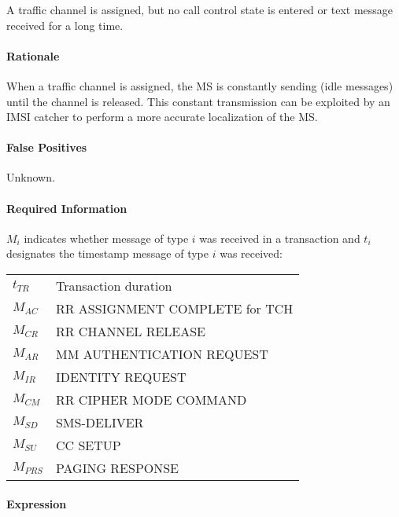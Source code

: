 \documentclass[a4paper,11pt,notitlepage,bigheadings,oneside]{scrartcl}
\begin{document}
\subsubsection{}

A traffic channel is assigned, but no call control state is entered or text
message received for a long time.

\paragraph{Rationale}

When a traffic channel is assigned, the MS is constantly sending (idle
messages) until the channel is released. This constant transmission can be
exploited by an IMSI catcher to perform a more accurate localization of the MS.

\paragraph{False Positives}

Unknown.

\paragraph{Required Information}

$M_i$ indicates whether message of type $i$ was received in a transaction and
$t_i$ designates the timestamp message of type $i$ was received:

\begin{tabular}{ll}
\hline
$t_{TR} $ & Transaction duration \\
$M_{AC} $ & RR ASSIGNMENT COMPLETE for TCH \\
$M_{CR} $ & RR CHANNEL RELEASE \\
$M_{AR} $ & MM AUTHENTICATION REQUEST \\
$M_{IR} $ & IDENTITY REQUEST \\
$M_{CM} $ & RR CIPHER MODE COMMAND \\
$M_{SD} $ & SMS-DELIVER \\
$M_{SU} $ & CC SETUP \\
$M_{PRS}$ & PAGING RESPONSE \\
\hline
\end{tabular}


\paragraph{Expression}
\end{document}

